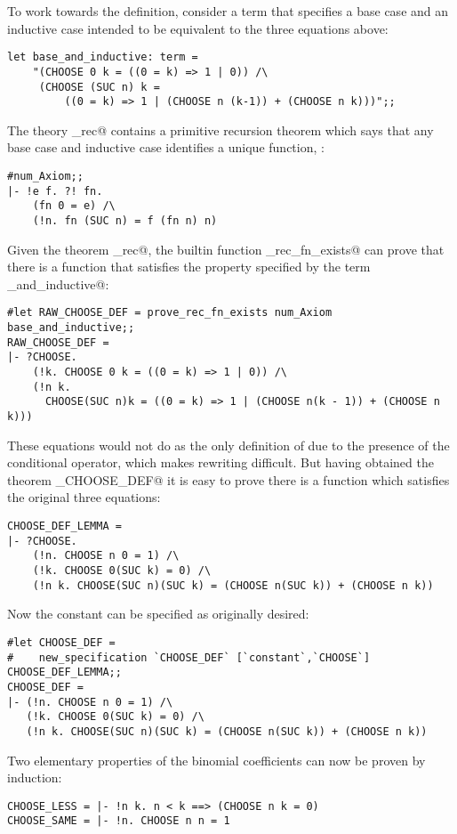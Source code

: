 To work towards the definition, consider a term that specifies a base case
and an inductive case intended to be equivalent to the three equations above:
\begin{session}
\begin{verbatim}
let base_and_inductive: term =
    "(CHOOSE 0 k = ((0 = k) => 1 | 0)) /\
     (CHOOSE (SUC n) k =
         ((0 = k) => 1 | (CHOOSE n (k-1)) + (CHOOSE n k)))";;
\end{verbatim}
\end{session}
The theory \verb@prim_rec@ contains a primitive recursion theorem which
says that any base case and inductive case identifies a unique function,
\verb@fn@:
\begin{session}
\begin{verbatim}
#num_Axiom;;
|- !e f. ?! fn.
    (fn 0 = e) /\
    (!n. fn (SUC n) = f (fn n) n)
\end{verbatim}
\end{session}
Given the theorem \verb@prim_rec@, the builtin function
\verb@prove_rec_fn_exists@ can prove that there is a function that satisfies
the property specified by the term \verb@base_and_inductive@:
\begin{session}
\begin{verbatim}
#let RAW_CHOOSE_DEF = prove_rec_fn_exists num_Axiom base_and_inductive;;
RAW_CHOOSE_DEF =
|- ?CHOOSE.
    (!k. CHOOSE 0 k = ((0 = k) => 1 | 0)) /\
    (!n k.
      CHOOSE(SUC n)k = ((0 = k) => 1 | (CHOOSE n(k - 1)) + (CHOOSE n k)))
\end{verbatim}
\end{session}
These equations would not do as the only definition of \verb@CHOOSE@ due
to the presence of the conditional operator, which makes rewriting
difficult.  But having obtained the theorem \verb@RAW_CHOOSE_DEF@ it is
easy to prove there is a function which satisfies the original three
equations:
\begin{session}
\begin{verbatim}
CHOOSE_DEF_LEMMA =
|- ?CHOOSE.
    (!n. CHOOSE n 0 = 1) /\
    (!k. CHOOSE 0(SUC k) = 0) /\
    (!n k. CHOOSE(SUC n)(SUC k) = (CHOOSE n(SUC k)) + (CHOOSE n k))
\end{verbatim}
\end{session}
Now the constant \verb@CHOOSE@ can be specified as originally desired:
\begin{session}
\begin{verbatim}
#let CHOOSE_DEF =
#    new_specification `CHOOSE_DEF` [`constant`,`CHOOSE`] CHOOSE_DEF_LEMMA;;
CHOOSE_DEF =
|- (!n. CHOOSE n 0 = 1) /\
   (!k. CHOOSE 0(SUC k) = 0) /\
   (!n k. CHOOSE(SUC n)(SUC k) = (CHOOSE n(SUC k)) + (CHOOSE n k))
\end{verbatim}
\end{session}
Two elementary properties of the binomial coefficients can now be proven
by induction:
\begin{session}
\begin{verbatim}
CHOOSE_LESS = |- !n k. n < k ==> (CHOOSE n k = 0)
CHOOSE_SAME = |- !n. CHOOSE n n = 1
\end{verbatim}
\end{session}

